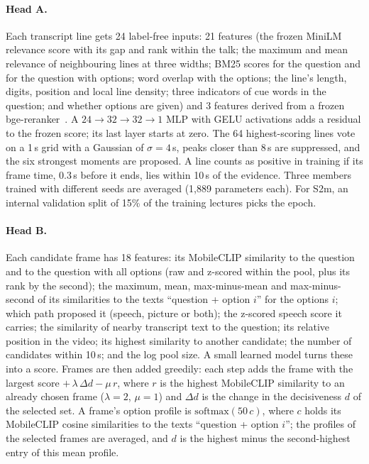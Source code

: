 \paragraph{Head A.}
Each transcript line gets 24 label-free inputs: 21 features (the frozen MiniLM relevance score with its gap and rank within the talk; the maximum and mean relevance of neighbouring lines at three widths; BM25 scores for the question and for the question with options; word overlap with the options; the line's length, digits, position and local line density; three indicators of cue words in the question; and whether options are given) and 3 features derived from a frozen bge-reranker~\cite{xiao2023cpack}.
A $24{\to}32{\to}32{\to}1$ MLP with GELU activations adds a residual to the frozen score; its last layer starts at zero.
The 64 highest-scoring lines vote on a 1\,s grid with a Gaussian of $\sigma{=}4$\,s, peaks closer than 8\,s are suppressed, and the six strongest moments are proposed.
A line counts as positive in training if its frame time, 0.3\,s before it ends, lies within 10\,s of the evidence.
Three members trained with different seeds are averaged (1,889 parameters each).
For S2m, an internal validation split of 15\% of the training lectures picks the epoch.

\paragraph{Head B.}
Each candidate frame has 18 features: its MobileCLIP similarity to the question and to the question with all options (raw and z-scored within the pool, plus its rank by the second); the maximum, mean, max-minus-mean and max-minus-second of its similarities to the texts ``question + option $i$'' for the options $i$; which path proposed it (speech, picture or both); the z-scored speech score it carries; the similarity of nearby transcript text to the question; its relative position in the video; its highest similarity to another candidate; the number of candidates within 10\,s; and the log pool size.
A small learned model turns these into a score.
Frames are then added greedily: each step adds the frame with the largest score $+\,\lambda\,\Delta d - \mu\,r$, where $r$ is the highest MobileCLIP similarity to an already chosen frame ($\lambda{=}2$, $\mu{=}1$) and $\Delta d$ is the change in the decisiveness $d$ of the selected set.
A frame's option profile is $\mathrm{softmax}(50\,c)$, where $c$ holds its MobileCLIP cosine similarities to the texts ``question + option $i$''; the profiles of the selected frames are averaged, and $d$ is the highest minus the second-highest entry of this mean profile.

